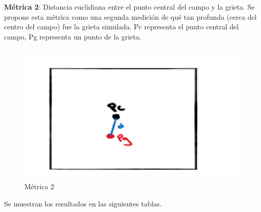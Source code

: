 \documentclass{article}
\begin{document}
\textbf{Métrica 2}: Distancia euclidiana entre el punto central del campo y la grieta. Se propone esta métrica como una segunda medición de qué tan profunda (cerca del centro del campo) fue la grieta simulada.  Pc representa el punto central del campo, Pg representa un punto de la grieta.\\
\\
\newpage
\begin{figure}[h]
	\centering
	\includegraphics[width=0.7\linewidth]{imagen2}
	\caption{Métrica 2}
	\label{fig:imagen2}
\end{figure}



Se muestran los resultados en las siguientes tablas.\\
\end{document}
